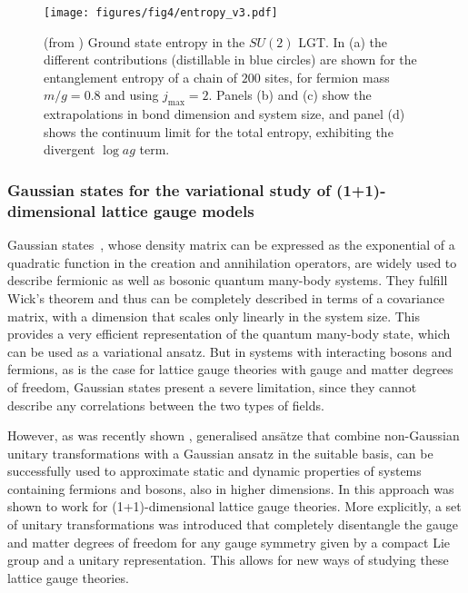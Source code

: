 \documentclass[epj,final]{svjour}
\begin{document}
\begin{figure}
\begin{minipage}[c]{\columnwidth} 
\texttt{[image: figures/fig4/entropy\_v3.pdf]}\\
\end{minipage}
\caption{(from \cite{banuls2017efficient}) Ground state entropy in the $SU(2)$ LGT. In (a) the different contributions (distillable in blue circles) are shown for the entanglement entropy of a chain of $200$ sites, for fermion mass $m/g=0.8$ and using $j_{\mathrm{max}}=2$. Panels (b) and (c) show the extrapolations in bond dimension and system size, and panel (d) shows the continuum limit for the total entropy,  exhibiting the divergent $\log ag$ term.}
\label{fig:su2_entropy}
\end{figure}

\subsubsection{Gaussian states for the variational study of (1+1)-dimensional lattice gauge models \cite{sala2018pos}}

Gaussian states~\cite{Bravyi2005,Kraus2009,Peschel2009}, whose density matrix can be expressed as the exponential of a quadratic function in the creation and annihilation operators, are widely used to describe fermionic as well as bosonic quantum many-body systems. They fulfill Wick's theorem and thus can be completely described in terms of a covariance matrix, with a dimension that scales only linearly in the system size. This provides a very efficient representation of the quantum many-body state, which can be used as a variational ansatz. But in systems with interacting bosons and fermions, as is the case for lattice gauge theories with gauge and matter degrees of freedom, Gaussian states present a severe limitation, since they cannot describe any correlations between the two types of fields. 

However, as was recently shown \cite{Shi2018}, generalised ans\"atze that combine non-Gaussian unitary transformations with a Gaussian ansatz in the suitable basis, can be successfully used to approximate static and dynamic properties of systems containing fermions and bosons, also in higher dimensions. In \cite{sala2018pos} this approach was shown to work for (1+1)-dimensional lattice gauge theories. More explicitly, a set of unitary transformations was introduced that completely disentangle the gauge and matter degrees of freedom for any gauge symmetry given by a compact Lie group and a unitary representation. This allows for new ways of studying these lattice gauge theories.
\end{document}
